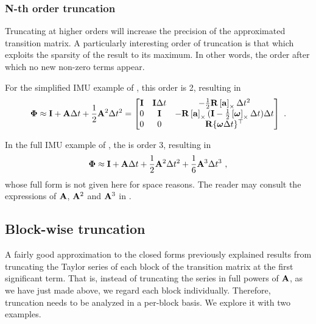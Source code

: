 \subsubsection{N-th order truncation}

Truncating at higher orders will increase the precision of the approximated transition matrix. 
A particularly interesting order of truncation is that which exploits the sparsity of the result to its maximum. 
In other words, the order after which no new non-zero terms appear.

For the simplified IMU example of , this order is 2, resulting in
%
\begin{equation}
{\bf\Phi} 
\approx {\bf I} + {\bf A}\Delta t + \frac12{\bf A}^2\Delta t^2
= \begin{bmatrix}
{\bf I} & {\bf I}\Delta t & -\frac12{\bf R}\left[{\bf a}\right]_\times\Delta t^2                           \\
0    & {\bf I}    &        -{\bf R}\left[{\bf a}\right]_\times({\bf I} - \frac12\left[{\bm \omega}\right]_\times\Delta t)\Delta t  \\
0    & 0       &         {\bf R}\{{\bm \omega}\Delta t\}^{\top}
\end{bmatrix}~.
\end{equation}

In the full IMU example of , the is order 3, resulting in
%
\begin{equation}
{\bf\Phi} \approx {\bf I} + {\bf A}\Delta t + \frac12{\bf A}^2\Delta t^2 + \frac16{\bf A}^3\Delta t^3~,
\end{equation}
%
whose full form is not given here for space reasons. 
The reader may consult the expressions of ${\bf A}$, ${\bf A}^2$ and ${\bf A}^3$ in .


\subsection{Block-wise truncation}
\label{sec:BlockWiseTruncation}
A fairly good approximation to the closed forms previously explained results from truncating the Taylor series of each block of the transition matrix at the first significant term. 
That is, instead of truncating the series in full powers of ${\bf A}$, as we have just made above, we regard each block individually. 
Therefore, truncation needs to be analyzed in a per-block basis. 
We explore it with two examples.

